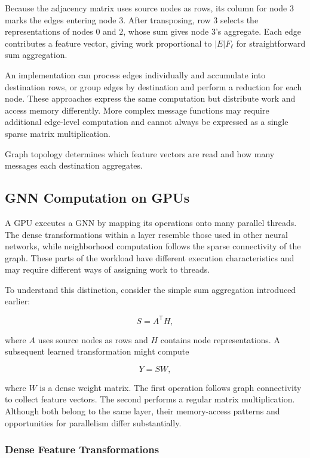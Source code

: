 Because the adjacency matrix uses source nodes as rows, its column for node $3$ marks the edges entering node $3$. After transposing, row $3$ selects the representations of nodes $0$ and $2$, whose sum gives node $3$'s aggregate. Each edge contributes a feature vector, giving work proportional to $|E|F_\ell$ for straightforward sum aggregation.

An implementation can process edges individually and accumulate into destination rows, or group edges by destination and perform a reduction for each node. These approaches express the same computation but distribute work and access memory differently. More complex message functions may require additional edge-level computation and cannot always be expressed as a single sparse matrix multiplication.

Graph topology determines which feature vectors are read and how many messages each destination aggregates.

\subsection{GNN Computation on GPUs}
\label{sec:gnn-computation-on-gpus}

A GPU executes a GNN by mapping its operations onto many parallel threads. The dense transformations within a layer resemble those used in other neural networks, while neighborhood computation follows the sparse connectivity of the graph. These parts of the workload have different execution characteristics and may require different ways of assigning work to threads.

To understand this distinction, consider the simple sum aggregation introduced earlier:

\[
  S=A^{\mathsf{T}}H,
\]

where $A$ uses source nodes as rows and $H$ contains node representations. A subsequent learned transformation might compute

\[
  Y=SW,
\]

where $W$ is a dense weight matrix. The first operation follows graph connectivity to collect feature vectors. The second performs a regular matrix multiplication. Although both belong to the same layer, their memory-access patterns and opportunities for parallelism differ substantially.

\subsubsection{Dense Feature Transformations}

